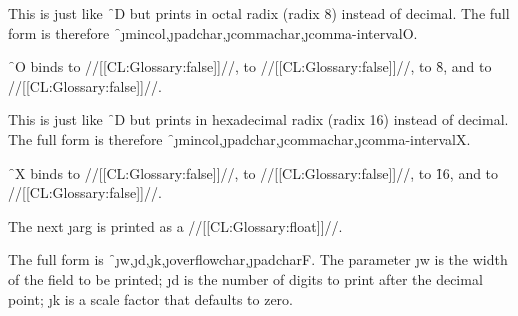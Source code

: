 \endsubsubsection%

 

This is just like \f{~D} but prints in octal radix (radix 8) instead of decimal.  The full form is therefore \f{~\j{mincol},\j{padchar},\j{commachar},\j{comma-interval}O}.

 \f{~O} binds
      to //[[CL:Glossary:false]]//,
      to //[[CL:Glossary:false]]//,
      to \f{8}, 
 and  to //[[CL:Glossary:false]]//.

\endsubsubsection%

 

This is just like \f{~D} but prints in hexadecimal radix (radix 16) instead of decimal.  The full form is therefore \f{~\j{mincol},\j{padchar},\j{commachar},\j{comma-interval}X}.

 \f{~X} binds
      to //[[CL:Glossary:false]]//,
      to //[[CL:Glossary:false]]//,
      to \f{16}, 
 and  to //[[CL:Glossary:false]]//.

\endsubsubsection%

\endsubsection%


 

The next \j{arg} is printed as a //[[CL:Glossary:float]]//.

The full form is \f{~\j{w},\j{d},\j{k},\j{overflowchar},\j{padchar}F}. The parameter \j{w} is the width of the field to be printed; \j{d} is the number of digits to print after the decimal point; \j{k} is a scale factor that defaults to zero.

